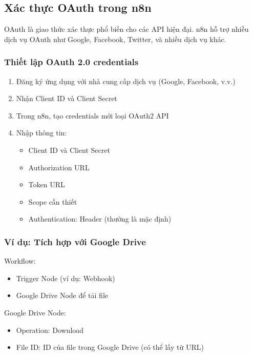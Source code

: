 \subsection{Xác thực OAuth trong n8n}

OAuth là giao thức xác thực phổ biến cho các API hiện đại. n8n hỗ trợ nhiều dịch vụ OAuth như Google, Facebook, Twitter, và nhiều dịch vụ khác.

\subsubsection{Thiết lập OAuth 2.0 credentials}

\begin{enumerate}
    \item Đăng ký ứng dụng với nhà cung cấp dịch vụ (Google, Facebook, v.v.)
    \item Nhận Client ID và Client Secret
    \item Trong n8n, tạo credentials mới loại OAuth2 API
    \item Nhập thông tin:
    \begin{itemize}
        \item Client ID và Client Secret
        \item Authorization URL
        \item Token URL
        \item Scope cần thiết
        \item Authentication: Header (thường là mặc định)
    \end{itemize}
\end{enumerate}

\subsubsection{Ví dụ: Tích hợp với Google Drive}

Workflow:
\begin{itemize}
    \item Trigger Node (ví dụ: Webhook)
    \item Google Drive Node để tải file
\end{itemize}

Google Drive Node:
\begin{itemize}
    \item Operation: Download
    \item File ID: ID của file trong Google Drive (có thể lấy từ URL)
\end{itemize}

